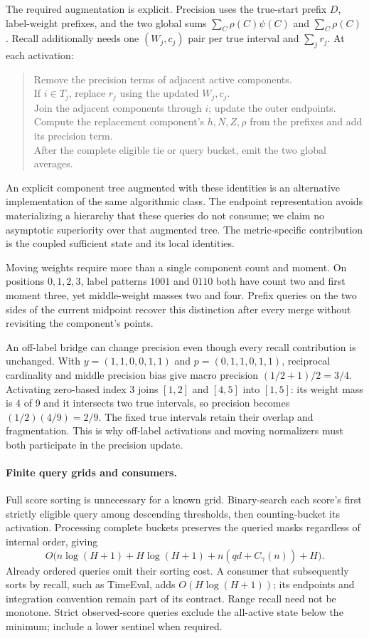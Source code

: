 The required augmentation is explicit. Precision uses the true-start prefix
$D$, label-weight prefixes, and the two global sums
$\sum_C\rho(C)\psi(C)$ and $\sum_C\rho(C)$. Recall additionally needs one
$(W_j,c_j)$ pair per true interval and $\sum_j r_j$. At each activation:
\begin{quote}\small
Remove the precision terms of adjacent active components.\\
If $i\in T_j$, replace $r_j$ using the updated $W_j,c_j$.\\
Join the adjacent components through $i$; update the outer endpoints.\\
Compute the replacement component's $h,N,Z,\rho$ from the prefixes and
add its precision term.\\
After the complete eligible tie or query bucket, emit the two global averages.
\end{quote}
An explicit component tree augmented with these identities is an alternative
implementation of the same algorithmic class. The endpoint representation
avoids materializing a hierarchy that these queries do not consume; we claim
no asymptotic superiority over that augmented tree. The metric-specific
contribution is the coupled sufficient state and its local identities.

Moving weights require more than a single component count and moment. On
positions $0,1,2,3$, label patterns $1001$ and $0110$ both have count two and
first moment three, yet middle-weight masses two and four. Prefix queries on
the two sides of the current midpoint recover this distinction after every
merge without revisiting the component's points.

An off-label bridge can change precision even though every recall contribution
is unchanged. With $y=(1,1,0,0,1,1)$ and $p=(0,1,1,0,1,1)$, reciprocal
cardinality and middle precision bias give macro precision
$(1/2+1)/2=3/4$. Activating zero-based index 3 joins $[1,2]$ and $[4,5]$ into
$[1,5]$: its weight mass is 4 of 9 and it intersects two true intervals, so
precision becomes $(1/2)(4/9)=2/9$. The fixed true intervals retain their
overlap and fragmentation. This is why off-label activations and moving
normalizers must both participate in the precision update.

\paragraph{Finite query grids and consumers.}
Full score sorting is unnecessary for a known grid. Binary-search each
score's first strictly eligible query among descending thresholds, then
counting-bucket its activation. Processing complete buckets preserves the
queried masks regardless of internal order, giving
\[
 O\bigl(n\log(H+1)+H\log(H+1)+n(qd+C_\gamma(n))+H\bigr).
\]
Already ordered queries omit their sorting cost. A consumer that subsequently
sorts by recall, such as TimeEval, adds $O(H\log(H+1))$; its endpoints and
integration convention remain part of its contract. Range recall need not
be monotone. Strict observed-score queries exclude the all-active state
below the minimum; include a lower sentinel when required.

